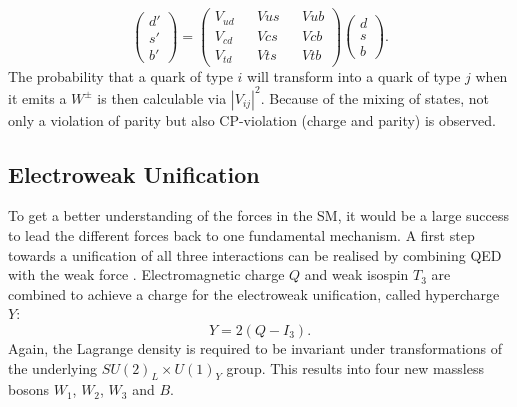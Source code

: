 	\begin{equation}
	\begin{pmatrix}d'\\s'\\b'\end{pmatrix} = 
	\begin{pmatrix}
	V_{ud}&&V{us}&&V{ub} \\
	V_{cd}&&V{cs}&&V{cb} \\
	V_{td}&&V{ts}&&V{tb}
	\end{pmatrix}
	\begin{pmatrix}d\\s\\b\end{pmatrix}.
	\end{equation}
	The probability that a quark of type $i$ will transform into a quark of type $j$ when it emits a $W^\pm$ is then calculable via $|V_{ij}|^2$. Because of the mixing of states, not only a violation of parity but also CP-violation (charge and parity) is observed.
	\subsection{Electroweak Unification}
	\label{sec:elw}	
	To get a better understanding of the forces in the SM, it would be a large success to lead the different forces back to one fundamental mechanism. A first step towards a unification of all three interactions can be realised by combining QED with the weak force \cite{ModernParticlePhysics}. Electromagnetic charge $Q$ and weak isospin $T_3$ are combined to achieve a charge for the electroweak unification, called hypercharge $Y$:
	\begin{equation}
	Y = 2(Q-I_3).
	\end{equation}
	Again, the Lagrange density is required to be invariant under transformations of the underlying $SU(2)_L \times U(1)_Y$ group. This results into four new massless bosons $W_1$, $W_2$, $W_3$ and $B$. 
